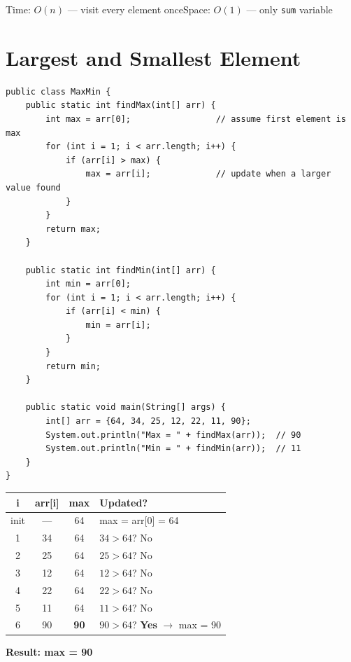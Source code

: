\documentclass[12pt,a4paper,oneside]{book}
\begin{document}
\begin{complexity}
Time: $O(n)$ --- visit every element once\quad Space: $O(1)$ --- only \texttt{sum} variable
\end{complexity}

\section{Largest and Smallest Element}

\begin{lstlisting}[caption={Find Max and Min in a single pass each}]
public class MaxMin {
    public static int findMax(int[] arr) {
        int max = arr[0];                 // assume first element is max
        for (int i = 1; i < arr.length; i++) {
            if (arr[i] > max) {
                max = arr[i];             // update when a larger value found
            }
        }
        return max;
    }

    public static int findMin(int[] arr) {
        int min = arr[0];
        for (int i = 1; i < arr.length; i++) {
            if (arr[i] < min) {
                min = arr[i];
            }
        }
        return min;
    }

    public static void main(String[] args) {
        int[] arr = {64, 34, 25, 12, 22, 11, 90};
        System.out.println("Max = " + findMax(arr));  // 90
        System.out.println("Min = " + findMin(arr));  // 11
    }
}
\end{lstlisting}

\begin{dryrun}
\begin{center}
\begin{tabular}{cccl}
\toprule
\textbf{i} & \textbf{arr[i]} & \textbf{max} & \textbf{Updated?}\\
\midrule
init& ---  & 64 & max = arr[0] = 64\\
1   & 34   & 64 & $34 > 64$? No\\
2   & 25   & 64 & $25 > 64$? No\\
3   & 12   & 64 & $12 > 64$? No\\
4   & 22   & 64 & $22 > 64$? No\\
5   & 11   & 64 & $11 > 64$? No\\
6   & 90   & \textbf{90} & $90 > 64$? \textbf{Yes} $\to$ max = 90\\
\bottomrule
\end{tabular}
\end{center}
\textbf{Result: max = 90}
\end{dryrun}
\end{document}
